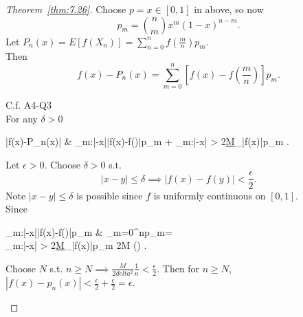 \begin{proof}[Theorem~\ref{thm:7.26}]
	Choose $p=x \in [0,1]$ in above, so now \[
		p_m= \binom{n}{m}x^{m}(1-x)^{n-m}
		.\]
	Let $P_{n}(x)=E \left[ f(X_n)\right]=\sum_{n=0}^{n}{f(\frac{m}{n})p_m}$.\\
	Then \[
		f(x)-P_n(x)=\sum_{m=0}^{n}{\left[ f(x)-f(\frac{m}{n})\right]p_m}
		.\]
	\begin{remark}
		C.f. A4-Q3\\
		For any $\delta>0$
		\begin{flalign*}
			\left|f(x)-P_n(x)\right| & \le \sum_{m:\left|-x\right|\le \delta}{\left|f(x)-f()\right|p_m} + \sum_{m:\left|-x\right| > \delta}{2\underline{M}_{\max\left|f(x)\right|}p_m}
			.\end{flalign*}
		Let $\epsilon>0$. Choose $\delta>0$ s.t. \[
			\left|x-y\right| \le \delta \implies \left|f(x)-f(y)\right|<\frac{\epsilon}{2}
			.\]
		Note $\left|x-y\right| \le \delta$ is possible since $f$ is uniformly continuous on $[0,1]$.\\
		Since
		\begin{flalign*}
			\sum_{m:\left|-x\right|\le \delta}{\left|f(x)-f()\right|p_m} & \le  {}	 \sum_{m=0}^{n}{p_m}=\frac{\epsilon}{2} \\
			\sum_{m:\left|-x\right| > \delta}{2\underline{M}_{\max\left|f(x)\right|}p_m} \le 2M   \;\;(\because {})\le {}\le \frac{M}{2 \delta^2 \frac{1}{n}}
			.\end{flalign*}
		Choose $N$ s.t. $n\ge N\implies \frac{M}{2delta^2}\frac{1}{n}<$.
		Then for $n\ge N$, $\left|f(x)-p_n(x)\right|<\frac{\epsilon}{2}+\frac{\epsilon}{2}=\epsilon$.
	\end{remark}
\end{proof}


